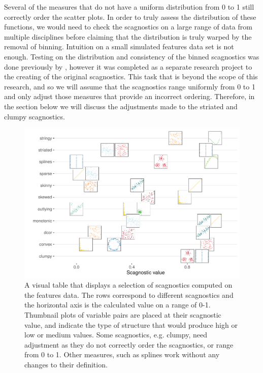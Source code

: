Several of the measures that do not have a uniform distribution from 0
to 1 still correctly order the scatter plots. In order to truly assess
the distribution of these functions, we would need to check the
scagnostics on a large range of data from multiple disciplines before
claiming that the distribution is truly warped by the removal of
binning. Intuition on a small simulated features data set is not enough.
Testing on the distribution and consistency of the binned scagnostics
was done previously by \citet{scagdist}, however it was completed as a
separate research project to the creating of the original scagnostics.
This task that is beyond the scope of this research, and so we will
assume that the scagnostics range uniformly from 0 to 1 and only adjust
those measures that provide an incorrect ordering. Therefore, in the
section below we will discuss the adjustments made to the striated and
clumpy scagnostics.

\begin{Schunk}
\begin{figure}
\includegraphics[width=1\linewidth]{mason-lee-laa-cook_files/figure-latex/visual-table-1} \caption[A visual table that displays a selection of scagnostics computed on the features data]{A visual table that displays a selection of scagnostics computed on the features data. The rows correspond to different scagnostics and the horizontal axis is the calculated value on a range of 0-1. Thumbnail plots of variable pairs are placed at their scagnostic value, and indicate the type of structure that would produce high or low or medium values. Some scagnostics, e.g. clumpy, need adjustment as they do not correctly order the scagnostics, or range from 0 to 1. Other measures, such as splines work without any changes to their definition.}\label{fig:visual-table}
\end{figure}
\end{Schunk}

